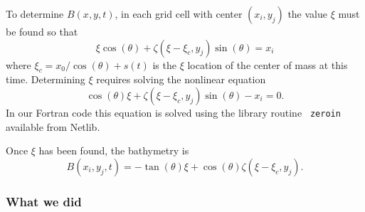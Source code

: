 To determine $B(x,y,t)$, 
in each grid cell with center $(x_i,
y_j)$ the value $\xi$ must be found so that
\[
\xi\cos(\theta) + \zeta(\xi - \xi_c,y_j)\sin(\theta) = x_i
\]
where $\xi_c = x_0/\cos(\theta) + s(t)$  is the $\xi$ location of the center
of mass at this time.
Determining $\xi$ requires solving the nonlinear equation
\[
\cos(\theta)\xi + \zeta(\xi - \xi_c, y_j) \sin(\theta) - x_i = 0.
\]
In our Fortran code this equation is solved using the library routine {\tt
zeroin} available from Netlib.

Once $\xi$ has been found, the bathymetry is 
\[
B(x_i,y_j,t) =
-\tan(\theta)\xi + \cos(\theta)\zeta(\xi - \xi_c, y_j).
\]


\subsubsection{What we did}\label{what}


